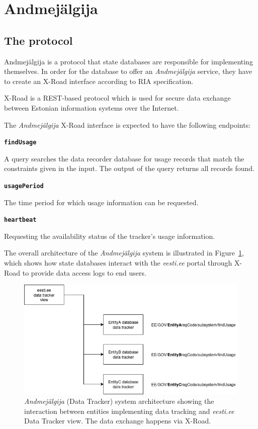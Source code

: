 \section{Andmejälgija} \label{Andmejälgija}

\subsection{The protocol} \label{protocol_desc}

Andmejälgija is a protocol that state databases are responsible for implementing themselves. In order for the database to offer an \textit{Andmejälgija} service, they have to create an X-Road interface according to RIA specification\cite{aj-github-spec}. 

X-Road is a REST-based protocol which is used for secure data exchange between Estonian information systems over the Internet.

The \textit{Andmejälgija} X-Road interface is expected to have the following endpoints:

\textbf{\texttt{findUsage}}

A query searches the data recorder database for usage records that match the constraints given in the input. The output of the query returns all records found\cite{aj-github-spec}.

\textbf{\texttt{usagePeriod}}

The time period for which usage information can be requested\cite{aj-github-spec}.

\textbf{\texttt{heartbeat}}

Requesting the availability status of the tracker's usage information\cite{aj-github-spec}.

The overall architecture of the \textit{Andmejälgija} system is illustrated in Figure~\ref{fig:aj-model}, which shows how state databases interact with the \textit{eesti.ee} portal through X-Road to provide data access logs to end users.

\begin{figure}[H]
\centering
\includegraphics[width=450px]{english/figures/aj_model.PNG}
\caption{\textit{Andmejälgija} (Data Tracker) system architecture showing the interaction between entities implementing data tracking and \textit{eesti.ee} Data Tracker view. The data exchange happens via X-Road\cite{aj-github}.}
\label{fig:aj-model}
\end{figure}

